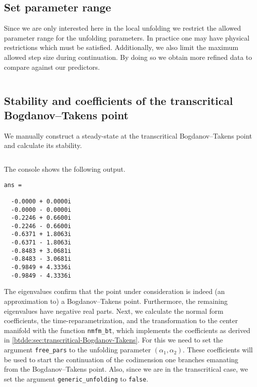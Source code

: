\subsection{Set parameter range}
Since we are only interested here in the local unfolding we restrict the
allowed parameter range for the unfolding parameters. In practice one may have
physical restrictions which must be satisfied. Additionally, we also limit the
maximum allowed step size during continuation. By doing so we obtain more refined
data to compare against our predictors.
\inputminted[firstline=35, lastline=38]{MATLAB}{\pathToDDEBifToolDemos/BAM_neural_network_model/BAMnn.m}

\subsection{Stability and coefficients of the transcritical Bogdanov--Takens point}
We manually construct a steady-state at the transcritical Bogdanov--Takens
point and calculate its stability.
\inputminted[firstline=40, lastline=49]{MATLAB}{\pathToDDEBifToolDemos/BAM_neural_network_model/BAMnn.m}

The \MATLAB console shows the following output.
\begin{verbatim}
ans =

  -0.0000 + 0.0000i
  -0.0000 - 0.0000i
  -0.2246 + 0.6600i
  -0.2246 - 0.6600i
  -0.6371 + 1.8063i
  -0.6371 - 1.8063i
  -0.8483 + 3.0681i
  -0.8483 - 3.0681i
  -0.9849 + 4.3336i
  -0.9849 - 4.3336i
\end{verbatim}
The eigenvalues confirm that the point under consideration is indeed (an
approximation to) a Bogdanov--Takens point. Furthermore, the remaining eigenvalues have
negative real parts. Next, we calculate the normal form coefficients, the
time-reparametrization, and the transformation to the center manifold with the
function \texttt{nmfm_bt}, which implements the coefficients as derived in
\cref{btdde:sec:transcritical-Bogdanov-Takens}. For this we need to set the argument
\texttt{free_pars} to the unfolding parameter $(\alpha_1,\alpha_2)$. These
coefficients will be used to start the continuation of the codimension one branches
emanating from the Bogdanov--Takens point. Also, since we are in the transcritical case,
we set the argument \texttt{generic_unfolding} to \texttt{false}.
\inputminted[firstline=51, lastline=55]{MATLAB}{\pathToDDEBifToolDemos/BAM_neural_network_model/BAMnn.m}

